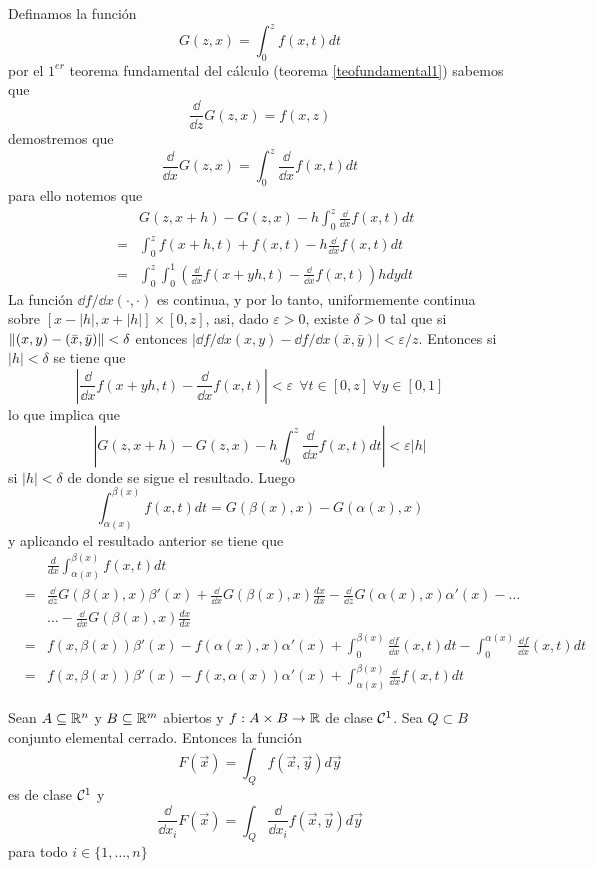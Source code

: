 \begin{demostracion}
Definamos la funci\'on
\[G(z,x)=\int_0^zf(x,t)dt\]
por el $1^{er}$ teorema fundamental del c\'alculo (teorema \ref{teofundamental1}) sabemos que
\[\frac{\dd}{\dd z}G(z,x)=f(x,z)\]
demostremos que
\[\frac{\dd }{\dd x}G(z,x)=\int_0^z\frac{\dd }{\dd x}f(x,t)dt\]
para ello notemos que
\begin{eqnarray*}
& &G(z,x+h)-G(z,x)-h\int_0^z\frac{\dd}{\dd x}f(x,t)dt\\
 &= &
\int_0^zf(x+h,t)+f(x,t)-h\frac{\dd}{\dd x}f(x,t)dt \\& = &
\int_0^z\int_0^1(\frac{\dd}{\dd x}f(x+yh,t)-\frac{\dd}{\dd
x}f(x,t))hdydt
\end{eqnarray*}
La funci\'on $\dd f/\dd x(\cdot,\cdot)$ es continua, y por lo
tanto, uniformemente continua sobre $[x-|h|,x+|h|]\times [0,z]$,
asi, dado $\varepsilon >0$, existe $\delta >0$ tal que si
$\lVert(x,y)-(\bar x,\bar y)\rVert<\delta$ entonces $|\dd f/\dd x
(x,y)-\dd f/\dd x(\bar x,\bar y)|<\varepsilon/z $. Entonces si
$|h|<\delta$ se tiene que
\[|\frac{\dd }{\dd x}f(x+yh,t)-\frac{\dd }{\dd x}f(x,t)|<\varepsilon\:\:\forall t\in [0,z]\:\forall y\in [0,1]\]
lo que implica que
\[|G(z,x+h)-G(z,x)-h\int_0^z\frac{\dd}{\dd x}f(x,t)dt|<\varepsilon |h|\]
si $|h|<\delta$ de donde se sigue el resultado. Luego
\[\int_{\alpha(x)}^{\beta(x)}f(x,t)dt=G(\beta(x),x)-G(\alpha(x),x)\]
y aplicando el resultado anterior se tiene que
\begin{eqnarray*}
& &\frac{d}{dx}\int_{\alpha(x)}^{\beta(x)}f(x,t)dt\\ &= &
\frac{\dd}{\dd z}G(\beta(x),x)\beta '(x)+\frac{\dd}{\dd
x}G(\beta(x),x)\frac{dx}{dx}-\frac{\dd }{\dd
z}G(\alpha(x),x)\alpha '(x)-\ldots \\& & \ldots-\frac{\dd }{\dd
x}G(\beta(x),x)\frac{dx}{dx} \\& = & f(x,\beta(x))\beta
'(x)-f(\alpha(x),x)\alpha '(x)+\int_0^{\beta(x)}\frac{\dd f}{\dd
x}(x,t)dt-\int_0^{\alpha(x)}\frac{\dd f}{\dd x}(x,t)dt\\& = &
f(x,\beta(x))\beta '(x)-f(x,\alpha(x))\alpha
'(x)+\int_{\alpha(x)}^{\beta(x)}\frac{\dd}{\dd x}f(x,t)dt
\end{eqnarray*}
\end{demostracion}

\begin{teorema} 
Sean $A\subseteq \mathbb{R}^n$ y $B\subseteq \mathbb{R}^m$ abiertos y $f:A\times B\to
\mathbb{R}$ de clase ${\cal{C}}^1$. Sea $Q\subset B$  conjunto elemental cerrado.
Entonces la funci\'on
\[F(\vec{x})=\int_Q f(\vec{x},\vec{y})d\vec{y} \]
es de clase ${\cal{C}}^1$ y
\[\frac{\dd}{\dd x_i}F(\vec{x})=\int_Q\frac{\dd }{\dd x_i}f(\vec{x},\vec{y})d\vec{y}\]
para todo $i\in\{1,\ldots,n\}$
\end{teorema}

